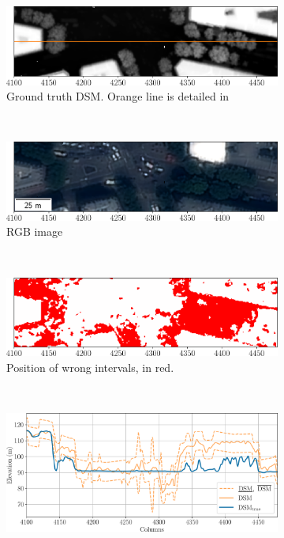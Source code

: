 \begin{figure}
    \centering
    \begin{subfigure}[t]{\linewidth}
        \flushright
        \includegraphics[width=0.95\linewidth]{Images/Chap_6/paris_error_tree_gt.png}
        \caption{Ground truth DSM. Orange line is detailed in }
        \label{fig:paris_error_tree_gt}
    \end{subfigure}\\
    \begin{subfigure}[t]{\linewidth}
        \flushright
        \includegraphics[width=0.95\linewidth]{Images/Chap_6/paris_error_tree_clr.png}
        \caption{RGB image}
        \label{fig:paris_error_tree_clr}
    \end{subfigure}\\
    \begin{subfigure}[t]{\linewidth}
        \flushright
        \includegraphics[width=0.95\linewidth]{Images/Chap_6/paris_error_tree_intervals.png}
        \caption{Position of wrong intervals, in red.}
        \label{fig:paris_error_tree_intervals}
    \end{subfigure}\\
    \begin{subfigure}[t]{\linewidth}
        \centering
        \includegraphics[width=\linewidth]{Images/Chap_6/paris_error_tree.png}

\end{subfigure}
\end{figure}
